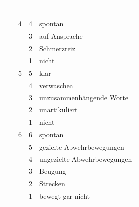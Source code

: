 \begin{table}[H]
\begin{WidePar}
\TableBaseModification
{}

\begin{tabulary}{\linewidth}{LCCL}\addlinespace\toprule\addlinespace
\noindent ~ & \noindent{} & \noindent{} &
\noindent{}
\\\midrule
{} & 4 & 4 & spontan
\\
 & & 3 & auf Ansprache
\\
 & & 2 & Schmerzreiz
\\
 & & 1 & nicht
\\\midrule
{} & 5 & 5 & klar
\\
 & & 4 & verwaschen
\\
 & & 3 & unzusammenhängende Worte
\\
 & & 2 & unartikuliert
\\
 & & 1 & nicht
\\\midrule
{} & 6 & 6 & spontan
\\
 & & 5 & gezielte Abwehrbewegungen
\\
 & & 4 & ungezielte Abwehrbewegungen
\\
 & & 3 & Beugung
\\
 & & 2 & Strecken
\\
 & & 1  & bewegt gar nicht
\\\bottomrule
\end{tabulary}
\end{WidePar}
\end{table}




